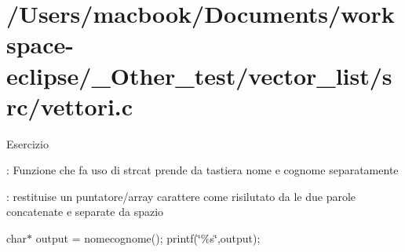 \hypertarget{_2_users_2macbook_2_documents_2workspace-eclipse_2__other_test_2vector_list_2src_2vettori_8c-example}{
\section{/Users/macbook/Documents/workspace-\/eclipse/\_\-Other\_\-test/vector\_\-list/src/vettori.c}
}
Esercizio

: Funzione che fa uso di strcat prende da tastiera nome e cognome separatamente

: restituise un puntatore/array carattere come risilutato da le due parole concatenate e separate da spazio

char$\ast$ output = nomecognome(); printf(\char`\"{}\%s\char`\"{},output);


\begin{DoxyCodeInclude}
\end{DoxyCodeInclude}
 